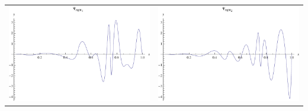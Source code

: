 \documentclass{article}
\begin{document}
\begin{landscape}
\begin{tabular}{cc}
\includegraphics[width=10.cm]{octic_wavelet_dright_1.pdf}& \includegraphics[width=10.cm]{octic_wavelet_dright_2.pdf} \\
\end{tabular} 
 \end{landscape}
\end{document}
